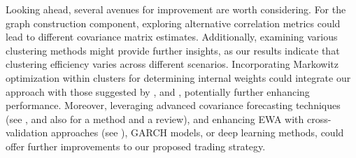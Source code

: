\documentclass[sigconf]{acmart}
\begin{document}
Looking ahead, several avenues for improvement are worth considering. For the graph construction component, exploring alternative correlation metrics could lead to different covariance matrix estimates. Additionally, examining various clustering methods might provide further insights, as our results indicate that clustering efficiency varies across different scenarios. Incorporating Markowitz optimization within clusters for determining internal weights could integrate our approach with those suggested by \cite{León}, \cite{Tola} and \cite{Gatta}, potentially further enhancing performance. Moreover, leveraging advanced covariance forecasting techniques (see \cite{zhang2022graphCov,gnn2023graphCov}, and also  \cite{CaoZheng} for a method and a review), and enhancing EWA with cross-validation approaches (see \cite{TanZohren}), GARCH models, or deep learning methods, could offer further improvements to our proposed trading strategy. 


\vspace{0mm}



\end{document}
